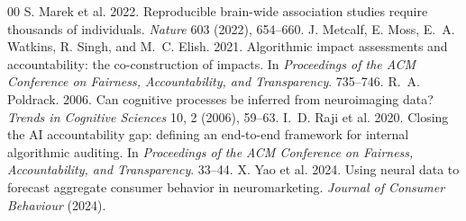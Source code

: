 \documentclass[sigconf,review,anonymous]{acmart}
\begin{document}
\begin{thebibliography}{00}
 S. Marek et al. 2022. Reproducible brain-wide association studies require thousands of individuals. \emph{Nature} 603 (2022), 654--660.
 J. Metcalf, E. Moss, E.~A. Watkins, R. Singh, and M.~C. Elish. 2021. Algorithmic impact assessments and accountability: the co-construction of impacts. In \emph{Proceedings of the ACM Conference on Fairness, Accountability, and Transparency}. 735--746.
 R.~A. Poldrack. 2006. Can cognitive processes be inferred from neuroimaging data? \emph{Trends in Cognitive Sciences} 10, 2 (2006), 59--63.
 I.~D. Raji et al. 2020. Closing the AI accountability gap: defining an end-to-end framework for internal algorithmic auditing. In \emph{Proceedings of the ACM Conference on Fairness, Accountability, and Transparency}. 33--44.
 X. Yao et al. 2024. Using neural data to forecast aggregate consumer behavior in neuromarketing. \emph{Journal of Consumer Behaviour} (2024).
\end{thebibliography}
\end{document}
